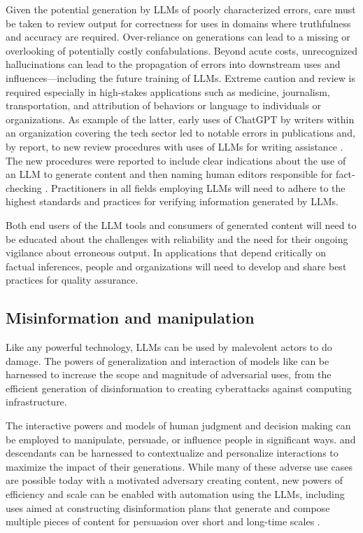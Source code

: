 Given the potential generation by LLMs of poorly characterized errors, care must be taken to review output for correctness for uses in domains where truthfulness and accuracy are required. Over-reliance on generations can lead to a missing or overlooking of potentially costly confabulations. Beyond acute costs, unrecognized hallucinations can lead to the propagation of errors into downstream uses and influences---including the future training of LLMs.  Extreme caution and review is required especially in high-stakes applications such as medicine, journalism, transportation, and attribution of behaviors or language to individuals or organizations.  As example of the latter, early uses of ChatGPT by writers within an organization covering the tech sector led to notable errors in publications and, by report, to new review procedures with uses of LLMs for writing assistance \cite{CNETpause2023}. The new procedures were reported to include clear indications about the use of an LLM to generate content and then naming human editors responsible for fact-checking \cite{CNETdirectorstatement2023}. Practitioners in all fields employing LLMs will need to adhere to the highest standards and practices for verifying information generated by LLMs.  

Both end users of the LLM tools and consumers of generated content will need to be educated about the challenges with reliability and the need for their ongoing vigilance about erroneous output. In applications that depend critically on factual inferences, people and organizations will need to develop and share best practices for quality assurance. 
 
\subsection{Misinformation and manipulation} 

Like any powerful technology, LLMs can be used by malevolent actors to do damage. The powers of generalization and interaction of models like {\DV} can be harnessed to increase the scope and magnitude of adversarial uses, from the efficient generation of disinformation to creating \hbox{cyberattacks} against computing infrastructure. 

The interactive powers and models of human judgment and decision making can be employed to manipulate, persuade, or influence people in significant ways. {\DV} and descendants can be harnessed to contextualize and personalize interactions to maximize the impact of their generations. While many of these adverse use cases are possible today with a motivated adversary creating content, new powers of efficiency and scale can be enabled with automation using the LLMs, including uses aimed at constructing disinformation plans that generate and compose multiple pieces of content for persuasion over short and long-time scales \cite{disinfoICMI2022}.  

